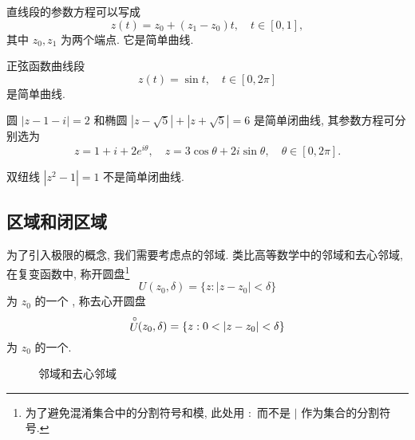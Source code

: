 \begin{example}\delspace
  \begin{enumnopar}[(i)]
    \item 直线段的参数方程可以写成
    \[z(t)=z_0+(z_1-z_0)t,\quad t\in[0,1],\]
    其中 $z_0,z_1$ 为两个端点.
    它是简单曲线.
    \item 正弦函数曲线段
    \[z(t)=\sin t,\quad t\in[0,2\pi]\]
    是简单曲线.
    \item 圆 $|z-1-i|=2$ 和椭圆 $|z-\sqrt5|+|z+\sqrt5|=6$ 是简单闭曲线,
    其参数方程可分别选为
    \[z=1+i+2e^{i\theta},\quad
    z=3\cos\theta+2i\sin\theta,\quad \theta\in[0,2\pi].
    \]
    \item 双纽线 $|z^2-1|=1$ 不是简单闭曲线.
  \end{enumnopar}
\end{example}



\subsection{区域和闭区域}

为了引入极限的概念, 我们需要考虑点的邻域.
类比高等数学中的邻域和去心邻域, 在复变函数中, 称开圆盘\footnote{%
  为了避免混淆集合中的分割符号和模, 此处用 $:$ 而不是 $\mid$ 作为集合的分割符号.%
}
  \[U(z_0,\delta)=\{z:|z-z_0|<\delta\}\]
为 $z_0$ 的一个 , 称去心开圆盘
  \[\Uc(z_0,\delta)=\{z:0<|z-z_0|<\delta\}\]
为 $z_0$ 的一个.

\begin{figure}[!ht]
  \centering
  \begin{minipage}{.48\textwidth}
    \centering
  \end{minipage}
  \begin{minipage}{.48\textwidth}
    \centering
  \end{minipage}
  \caption{邻域和去心邻域}
\end{figure}

